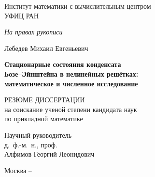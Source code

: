\documentclass[candidate, href, colorlinks]{disser}
\begin{document}
\begin{titlepage}
\thispagestyle{empty}
\enlargethispage{1cm}
\vspace*{-2cm}

\begin{center}
	Институт математики с вычислительным центром \\ УФИЦ РАН
\end{center}

\vskip1cm
	
\begin{flushright}
	\emph{На правах рукописи}
\end{flushright}
	
\vskip3cm

\begin{center}
	{\large Лебедев Михаил Евгеньевич}
	\vskip1cm
	{\Large\bfseries Стационарные состояния конденсата \\ Бозе--Эйнштейна в нелинейных решётках: \\ математическое и численное исследование \par}
	\vskip1.5cm
	{РЕЗЮМЕ ДИССЕРТАЦИИ \\ на соискание ученой степени кандидата наук \\ по прикладной математике}
\end{center}

\vskip2cm

\hspace{8cm}\begin{minipage}{0.4\linewidth}
	Научный руководитель \\
	д.~ф.-м.~н., проф. \\
	Алфимов Георгий Леонидович
\end{minipage}

\vfill

\begin{center}
	{Москва -- \the\year}
\end{center}

\normalfont\clearpage
\end{titlepage}
\end{document}
